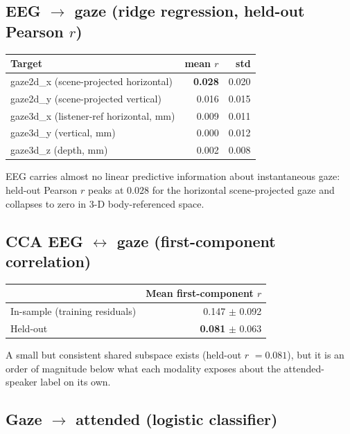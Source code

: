 \subsection{EEG $\rightarrow$ gaze (ridge regression, held-out Pearson $r$)}

\begin{table}[ht]
\centering
\begin{tabular}{lrr}
\toprule
Target & mean $r$ & std \\
\midrule
gaze2d\_x (scene-projected horizontal) & \textbf{0.028} & 0.020 \\
gaze2d\_y (scene-projected vertical)   & 0.016 & 0.015 \\
gaze3d\_x (listener-ref horizontal, mm) & 0.009 & 0.011 \\
gaze3d\_y (vertical, mm)                & 0.000 & 0.012 \\
gaze3d\_z (depth, mm)                   & 0.002 & 0.008 \\
\bottomrule
\end{tabular}
\end{table}

EEG carries almost no linear predictive information about instantaneous
gaze: held-out Pearson $r$ peaks at $0.028$ for the horizontal
scene-projected gaze and collapses to zero in 3-D body-referenced space.

\subsection{CCA EEG $\leftrightarrow$ gaze (first-component correlation)}

\begin{table}[ht]
\centering
\begin{tabular}{lr}
\toprule
 & Mean first-component $r$ \\
\midrule
In-sample (training residuals) & 0.147 $\pm$ 0.092 \\
Held-out                        & \textbf{0.081} $\pm$ 0.063 \\
\bottomrule
\end{tabular}
\end{table}

A small but consistent shared subspace exists (held-out $r$ $= 0.081$),
but it is an order of magnitude below what each modality exposes about
the attended-speaker label on its own.

\subsection{Gaze $\rightarrow$ attended (logistic classifier)}

